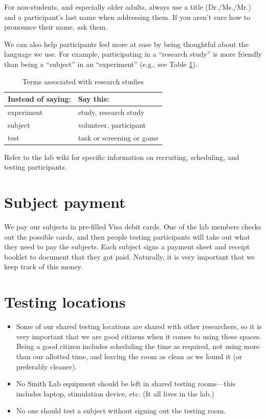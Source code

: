 \documentclass[letterpaper,12pt,oneside]{memoir}
\begin{document}
For non-students, and especially older adults, always use a title (Dr./Ms./Mr.) and a participant's last name when addressing them. If you aren't sure how to pronounce their name, ask them.

We can also help participants feel more at ease by being thoughtful about the language we use. For example, participating in a ``research study'' is more friendly than being a ``subject'' in an ``experiment'' (e.g., see Table \ref{table:terms}).

\begin{table}
\centering
\caption{Terms associated with research studies}
\begin{tabular}{ll}
\toprule
Instead of saying: & Say this:\\
\midrule
experiment& study, research study\\
subject& volunteer, participant\\
test & task or screening or game \\
\bottomrule
\end{tabular}
\label{table:terms}
\end{table}

Refer to the lab wiki for specific information on recruiting, scheduling, and testing participants.


\section{Subject payment}
\label{sec:subject_payment}

We pay our subjects in pre-filled Visa debit cards. One of the lab members checks out the possible cards, and then people testing participants will take out what they need to pay the subjects. Each subject signs a payment sheet and receipt booklet to document that they got paid. Naturally, it is very important that we keep track of this money.



\section{Testing locations}
\label{sec:testing_locations}

\begin{itemize}
\item Some of our shared testing locations are shared with other researchers, so it is very important that we are good citizens when it comes to using these spaces. Being a good citizen includes scheduling the time as required, not using more than our allotted time, and leaving the room as clean as we found it (or preferably cleaner).

\item No Smith Lab equipment should be left in shared testing rooms---this includes laptop, stimulation device, etc. (It all lives in the lab.)

\item No one should test a subject without signing out the testing room.
\end{itemize}
\end{document}
